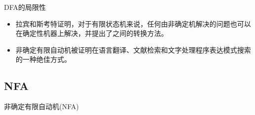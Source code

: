\documentclass{beamer}
\newcommand{\wuhao}{\fontsize{10.5pt}{\baselineskip}\selectfont}
\begin{document}
\begin{frame}{DFA的局限性}
	\begin{itemize}
	\item
	拉宾和斯考特证明，对于有限状态机来说，任何由非确定机解决的问题也可以在确定性机器上解决，并提出了之间的转换方法。
	\item
	非确定有限自动机被证明在语言翻译、文献检索和文字处理程序表达模式搜索的一种绝佳方式。
	\end{itemize}
\end{frame}

\subsection{NFA}
\begin{frame}{非确定有限自动机(NFA)}\wuhao{
\begin{itemize}
	\item<1-> 拉宾和斯考特提出了非确定状态的有限自动机，引入了$\epsilon$
	\item<2-> 非确定状态有限自动机很难用计算机来判别
	\item<3-> 非确定状态有限自动机人很容易写出
	\item<4-> 非确定自动机可以转化为自动机
	\end{itemize}}
\end{frame}
\end{document}
